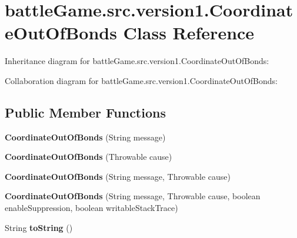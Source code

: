 \hypertarget{classbattleGame_1_1src_1_1version1_1_1CoordinateOutOfBonds}{}\section{battle\+Game.\+src.\+version1.\+Coordinate\+Out\+Of\+Bonds Class Reference}
\label{classbattleGame_1_1src_1_1version1_1_1CoordinateOutOfBonds}


Inheritance diagram for battle\+Game.\+src.\+version1.\+Coordinate\+Out\+Of\+Bonds\+:


Collaboration diagram for battle\+Game.\+src.\+version1.\+Coordinate\+Out\+Of\+Bonds\+:
\subsection*{Public Member Functions}
\begin{DoxyCompactItemize}
\item 
{\bfseries Coordinate\+Out\+Of\+Bonds} (String message)\hypertarget{classbattleGame_1_1src_1_1version1_1_1CoordinateOutOfBonds_a5fba1ee3222cb16c1ea12e251756b818}{}\label{classbattleGame_1_1src_1_1version1_1_1CoordinateOutOfBonds_a5fba1ee3222cb16c1ea12e251756b818}

\item 
{\bfseries Coordinate\+Out\+Of\+Bonds} (Throwable cause)\hypertarget{classbattleGame_1_1src_1_1version1_1_1CoordinateOutOfBonds_a0278b8defb16319a658492861ecede8e}{}\label{classbattleGame_1_1src_1_1version1_1_1CoordinateOutOfBonds_a0278b8defb16319a658492861ecede8e}

\item 
{\bfseries Coordinate\+Out\+Of\+Bonds} (String message, Throwable cause)\hypertarget{classbattleGame_1_1src_1_1version1_1_1CoordinateOutOfBonds_a9e07a1e9289f52da946bb31354e0e52b}{}\label{classbattleGame_1_1src_1_1version1_1_1CoordinateOutOfBonds_a9e07a1e9289f52da946bb31354e0e52b}

\item 
{\bfseries Coordinate\+Out\+Of\+Bonds} (String message, Throwable cause, boolean enable\+Suppression, boolean writable\+Stack\+Trace)\hypertarget{classbattleGame_1_1src_1_1version1_1_1CoordinateOutOfBonds_ae56c996868806b4c8017b4db186f06e3}{}\label{classbattleGame_1_1src_1_1version1_1_1CoordinateOutOfBonds_ae56c996868806b4c8017b4db186f06e3}

\item 
String {\bfseries to\+String} ()\hypertarget{classbattleGame_1_1src_1_1version1_1_1CoordinateOutOfBonds_acac1120e11de31e293f38bca3996c4dd}{}\label{classbattleGame_1_1src_1_1version1_1_1CoordinateOutOfBonds_acac1120e11de31e293f38bca3996c4dd}

\end{DoxyCompactItemize}


